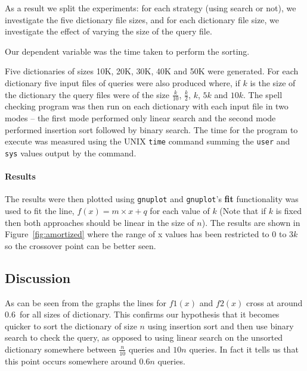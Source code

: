 \documentclass[a4]{article}
\begin{document}
As a result we split the experiments: for each strategy (using search or not), we investigate the five dictionary file sizes, and for each dictionary file size, we investigate the effect of varying the size of the query file.

Our dependent variable was the time taken to perform the sorting.

Five dictionaries of sizes 10K, 20K, 30K, 40K and 50K were generated.    For each dictionary five input files of queries were also produced where, if $k$ is the size of the dictionary the query files were of the size $\frac{k}{10}$, $\frac{k}{2}$, $k$, $5k$ and $10k$.  The spell checking program was then run on each dictionary with each input file in two modes -- the first mode performed only linear search and the second mode performed insertion sort followed by binary search.  The time for the program to execute was measured using the UNIX \texttt{time} command summing the \texttt{user} and \texttt{sys} values output by the command.  


\paragraph{Results} The results were then plotted using \texttt{gnuplot} and \texttt{gnuplot}'s {\bf fit} functionality was used to fit the line, $f(x) = m \times x + q$ for each value of $k$ (Note that if $k$ is fixed then both approaches should be linear in the size of $n$).  The results are shown in Figure~\ref{fig:amortized} where the range of x values has been restricted to 0 to $3k$ so the crossover point can be better seen.  


\newcommand{\crossover}{0.6}
\subsection{Discussion}
As can be seen from the graphs the lines for $f1(x)$ and $f2(x)$ cross at around \crossover\ for all sizes of dictionary.  This confirms our hypothesis that it becomes quicker to sort the dictionary of size $n$ using insertion sort and then use binary search to check the query, as opposed to using linear search on the unsorted dictionary somewhere between $\frac{n}{10}$ queries and $10n$ queries.  In fact it tells us that this point occurs somewhere around \crossover$n$ queries.
\end{document}
